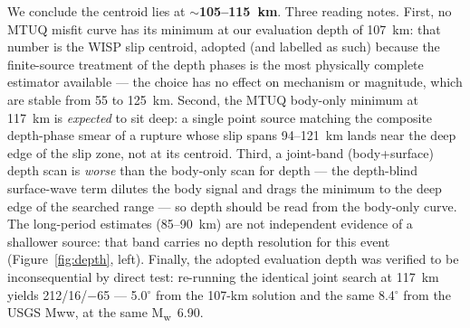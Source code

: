\documentclass[11pt]{article}
\newcommand{\Mw}{M\textsubscript{w}}
\begin{document}
We conclude the centroid lies at \textbf{$\sim$105--115~km}. Three reading notes. First, no
MTUQ misfit curve has its minimum at our evaluation depth of 107~km: that number is the WISP
slip centroid, adopted (and labelled as such) because the finite-source treatment of the depth
phases is the most physically complete estimator available --- the choice has no effect on
mechanism or magnitude, which are stable from 55 to 125~km. Second, the MTUQ body-only minimum
at 117~km is \emph{expected} to sit deep: a single point source matching the composite
depth-phase smear of a rupture whose slip spans 94--121~km lands near the deep edge of the
slip zone, not at its centroid. Third, a joint-band (body+surface) depth scan is \emph{worse}
than the body-only scan for depth --- the depth-blind surface-wave term dilutes the body
signal and drags the minimum to the deep edge of the searched range --- so depth should be
read from the body-only curve. The long-period estimates (85--90~km) are not independent
evidence of a shallower source: that band carries no depth resolution for this event
(Figure~\ref{fig:depth}, left). Finally, the adopted evaluation depth was verified to be
inconsequential by direct test: re-running the identical joint search at 117~km yields
212/16/$-$65 --- 5.0$^\circ$ from the 107-km solution and the same 8.4$^\circ$ from the USGS
Mww, at the same \Mw~6.90.
\end{document}
